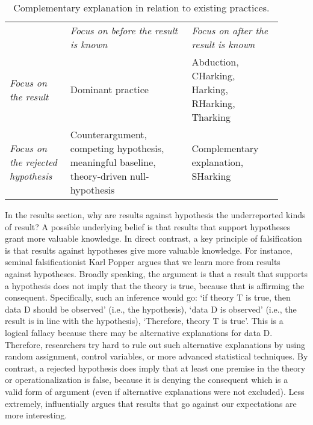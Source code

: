 \documentclass[authordate, meta]{jote-new-article}
\begin{document}
\begin{table}[H]

  \begin{fullwidth}
    \caption{Complementary explanation in relation to existing practices.
    }
    \label{tab:2}
    \begin{tabularx}{\columnwidth}{@{}>{\RaggedRight\arraybackslash}p{0.2\linewidth} >{\RaggedRight\arraybackslash}p{0.40\linewidth} >{\RaggedRight\arraybackslash}p{0.30\linewidth}@{}}

                                              & \emph{Focus on before the result is known}                                                & \emph{Focus on after the result is known}        \\
      \emph{Focus on the result}              & Dominant practice                                                                         & Abduction, CHarking, Harking, RHarking, Tharking \\
      \emph{Focus on the rejected hypothesis} & Counterargument, competing hypothesis, meaningful baseline, theory-driven null-hypothesis & Complementary explanation, SHarking              \\
    \end{tabularx}
  \end{fullwidth}
\end{table}


In the results section, why are results against hypothesis the underreported kinds of result? A possible underlying belief is that results that support hypotheses grant more valuable knowledge. In direct contrast, a key principle of falsification is that results against hypotheses give more valuable knowledge. For instance, seminal falsificationist Karl Popper argues that we learn more from results against hypotheses. Broadly speaking, the argument is that a result that supports a hypothesis does not imply that the theory is true, because that is affirming the consequent. Specifically, such an inference would go: ‘if theory T is true, then data D should be observed' (i.e., the hypothesis), ‘data D is observed' (i.e., the result is in line with the hypothesis), ‘Therefore, theory T is true'. This is a logical fallacy because there may be alternative explanations for data D. Therefore, researchers try hard to rule out such alternative explanations by using random assignment, control variables, or more advanced statistical techniques. By contrast, a rejected hypothesis does imply that at least one premise in the theory or operationalization is false, because it is denying the consequent which is a valid form of argument (even if alternative explanations were not excluded). Less extremely, \parencite{Davis1971}  influentially argues that results that go against our expectations are more interesting.
\end{document}
